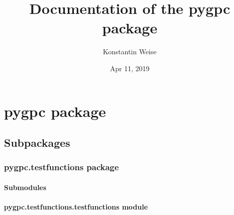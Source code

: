 \documentclass[letterpaper,10pt,english,openany,oneside]{sphinxmanual}
\title{Documentation of the pygpc package}
\date{Apr 11, 2019}
\author{Konstantin Weise}
\begin{document}
\pagestyle{empty}
\sphinxmaketitle
\pagestyle{plain}
\sphinxtableofcontents
\pagestyle{normal}
\label{\detokenize{index::doc}}



\chapter{pygpc package}
\label{\detokenize{pygpc:pygpc-package}}\label{\detokenize{pygpc::doc}}

\section{Subpackages}
\label{\detokenize{pygpc:subpackages}}

\subsection{pygpc.testfunctions package}
\label{\detokenize{pygpc.testfunctions:pygpc-testfunctions-package}}\label{\detokenize{pygpc.testfunctions::doc}}

\subsubsection{Submodules}
\label{\detokenize{pygpc.testfunctions:submodules}}

\subsubsection{pygpc.testfunctions.testfunctions module}
\label{\detokenize{pygpc.testfunctions:module-pygpc.testfunctions.testfunctions}}\label{\detokenize{pygpc.testfunctions:pygpc-testfunctions-testfunctions-module}}
\end{document}
